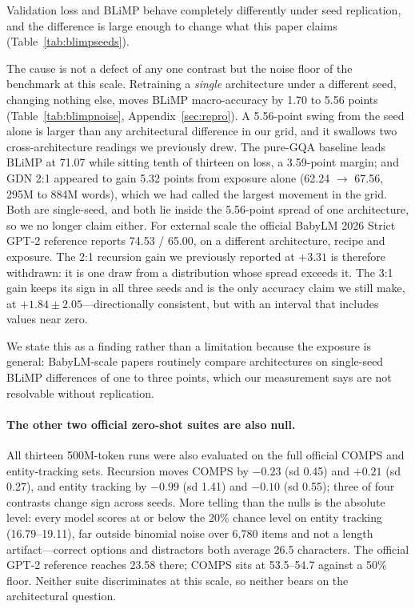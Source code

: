 \documentclass[11pt]{article}
\begin{document}
Validation loss and BLiMP behave completely differently under seed replication, and the difference is large enough to change what this paper claims (Table~\ref{tab:blimpseeds}).

The cause is not a defect of any one contrast but the noise floor of the benchmark at this scale. Retraining a \emph{single} architecture under a different seed, changing nothing else, moves BLiMP macro-accuracy by 1.70 to 5.56 points (Table~\ref{tab:blimpnoise}, Appendix~\ref{sec:repro}). A 5.56-point swing from the seed alone is larger than any architectural difference in our grid, and it swallows two cross-architecture readings we previously drew. The pure-GQA baseline leads BLiMP at 71.07 while sitting tenth of thirteen on loss, a 3.59-point margin; and GDN 2:1 appeared to gain 5.32 points from exposure alone (62.24 $\rightarrow$ 67.56, 295M to 884M words), which we had called the largest movement in the grid. Both are single-seed, and both lie inside the 5.56-point spread of one architecture, so we no longer claim either. For external scale the official BabyLM 2026 Strict GPT-2 reference reports 74.53 / 65.00, on a different architecture, recipe and exposure. The 2:1 recursion gain we previously reported at $+3.31$ is therefore withdrawn: it is one draw from a distribution whose spread exceeds it. The 3:1 gain keeps its sign in all three seeds and is the only accuracy claim we still make, at $+1.84 \pm 2.05$---directionally consistent, but with an interval that includes values near zero.

We state this as a finding rather than a limitation because the exposure is general: BabyLM-scale papers routinely compare architectures on single-seed BLiMP differences of one to three points, which our measurement says are not resolvable without replication.

\paragraph{The other two official zero-shot suites are also null.} All thirteen 500M-token runs were also evaluated on the full official COMPS and entity-tracking sets. Recursion moves COMPS by $-0.23$ (sd 0.45) and $+0.21$ (sd 0.27), and entity tracking by $-0.99$ (sd 1.41) and $-0.10$ (sd 0.55); three of four contrasts change sign across seeds. More telling than the nulls is the absolute level: every model scores at or below the 20\% chance level on entity tracking (16.79--19.11), far outside binomial noise over 6{,}780 items and not a length artifact---correct options and distractors both average 26.5 characters. The official GPT-2 reference reaches 23.58 there; COMPS sits at 53.5--54.7 against a 50\% floor. Neither suite discriminates at this scale, so neither bears on the architectural question.
\end{document}
